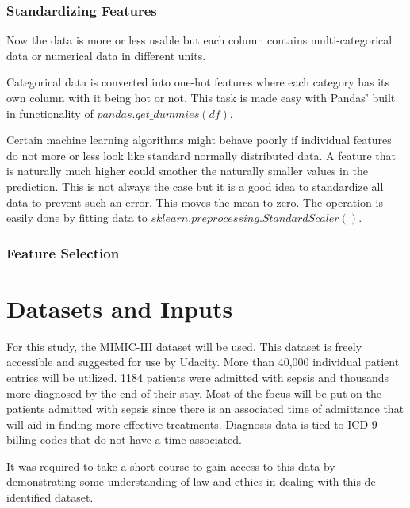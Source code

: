\documentclass[11pt]{article}
\begin{document}
		\subsubsection{Standardizing Features}
		Now the data is more or less usable but each column contains multi-categorical data or numerical data in different units.
		
		Categorical data is converted into one-hot features where each category has its own column with it being hot or not. This task is made easy with Pandas' built in functionality of \(pandas.get\_dummies(df)\).
		
		Certain machine learning algorithms might behave poorly if individual features do not more or less look like standard normally distributed data. A feature that is naturally much higher could smother the naturally smaller values in the prediction. This is not always the case but it is a good idea to standardize all data to prevent such an error. This moves the mean to zero. The operation is easily done by fitting data to \(sklearn.preprocessing.StandardScaler()\).
		
		\subsubsection{Feature Selection}
		
			
	\section{Datasets and Inputs}
	For this study, the MIMIC-III dataset will be used. This dataset is freely accessible and suggested for use by Udacity. More than 40,000 individual patient entries will be utilized. 1184 patients were admitted with sepsis and thousands more diagnosed by the end of their stay. Most of the focus will be put on the patients admitted with sepsis since there is an associated time of admittance that will aid in finding more effective treatments. Diagnosis data is tied to ICD-9 billing codes that do not have a time associated.
	
	It was required to take a short course to gain access to this data by demonstrating some understanding of law and ethics in dealing with this de-identified dataset.
	
\end{document}
